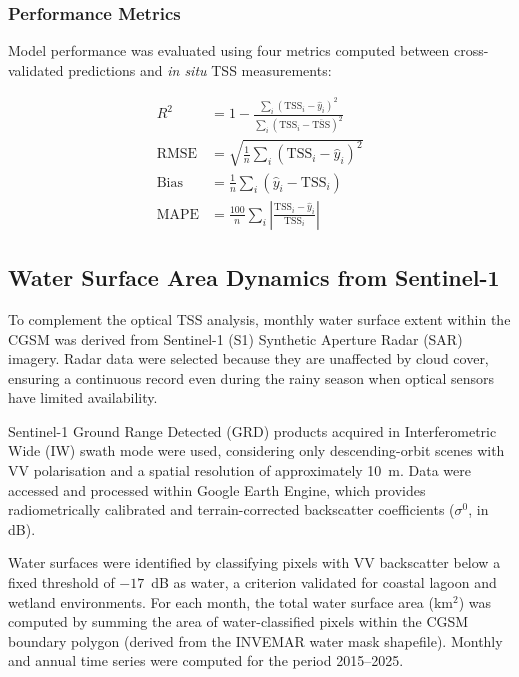 \documentclass[remotesensing,article,submit,pdftex,moreauthors]{Definitions/mdpi}
\begin{document}
\subsubsection{Performance Metrics}
\label{sec:metrics}
 
Model performance was evaluated using four metrics computed between
cross-validated predictions and \textit{in situ} TSS measurements:
 
\begin{align}
R^2         &= 1 - \frac{\displaystyle\sum_i (\text{TSS}_i - \hat{y}_i)^2}
                        {\displaystyle\sum_i (\text{TSS}_i - \overline{\text{TSS}})^2}
\label{eq:r2}\\[6pt]
\text{RMSE} &= \sqrt{\frac{1}{n}\sum_i (\text{TSS}_i - \hat{y}_i)^2}
\label{eq:rmse}\\[6pt]
\text{Bias} &= \frac{1}{n}\sum_i (\hat{y}_i - \text{TSS}_i)
\label{eq:bias}\\[6pt]
\text{MAPE} &= \frac{100}{n}\sum_i
              \left|\frac{\text{TSS}_i - \hat{y}_i}{\text{TSS}_i}\right|
\label{eq:mape}
\end{align}
 
 
\subsection{Water Surface Area Dynamics from Sentinel-1}
\label{sec:s1}
 
To complement the optical TSS analysis, monthly water surface extent
within the CGSM was derived from Sentinel-1 (S1) Synthetic Aperture
Radar (SAR) imagery. Radar data were selected because they are
unaffected by cloud cover, ensuring a continuous record even during the
rainy season when optical sensors have limited availability.
 
Sentinel-1 Ground Range Detected (GRD) products acquired in
Interferometric Wide (IW) swath mode were used, considering only
descending-orbit scenes with VV polarisation and a spatial resolution
of approximately 10~m. Data were accessed and processed within Google
Earth Engine, which provides radiometrically calibrated and
terrain-corrected backscatter coefficients ($\sigma^0$, in dB).
 
Water surfaces were identified by classifying pixels with VV backscatter
below a fixed threshold of $-17$~dB as water, a criterion validated for
coastal lagoon and wetland environments. For each month, the total water
surface area (km$^2$) was computed by summing the area of water-classified
pixels within the CGSM boundary polygon (derived from the INVEMAR water
mask shapefile). Monthly and annual time series were computed for the
period 2015--2025.
\end{document}

